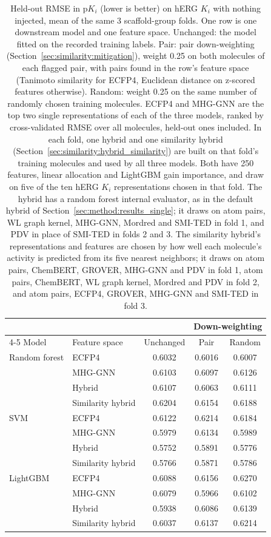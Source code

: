 \begin{table}[htbp]
\centering
\small
\begin{tabular}{@{}llccc@{}}
\toprule
 & & & \multicolumn{2}{c}{Down-weighting} \\
\cmidrule(l){4-5}
Model & Feature space & Unchanged & Pair & Random \\
\midrule
Random forest & ECFP4 & 0.6032 & 0.6016 & 0.6007 \\
 & MHG-GNN & 0.6103 & 0.6097 & 0.6126 \\
 & Hybrid & 0.6107 & 0.6063 & 0.6111 \\
 & Similarity hybrid & 0.6204 & 0.6154 & 0.6188 \\
\addlinespace
SVM & ECFP4 & 0.6122 & 0.6214 & 0.6184 \\
 & MHG-GNN & 0.5979 & 0.6134 & 0.5989 \\
 & Hybrid & 0.5752 & 0.5891 & 0.5776 \\
 & Similarity hybrid & 0.5766 & 0.5871 & 0.5786 \\
\addlinespace
LightGBM & ECFP4 & 0.6088 & 0.6156 & 0.6270 \\
 & MHG-GNN & 0.6079 & 0.5966 & 0.6102 \\
 & Hybrid & 0.5938 & 0.6086 & 0.6139 \\
 & Similarity hybrid & 0.6037 & 0.6137 & 0.6214 \\
\bottomrule
\end{tabular}
\caption[Pair down-weighting on the recorded hERG $K_i$ labels]{Held-out RMSE in p$K_i$ (lower is better) on hERG $K_i$ with nothing injected, mean of the same 3 scaffold-group folds. One row is one downstream model and one feature space. Unchanged: the model fitted on the recorded training labels. Pair: pair down-weighting (Section~\ref{sec:similarity:mitigation}), weight 0.25 on both molecules of each flagged pair, with pairs found in the row's feature space (Tanimoto similarity for ECFP4, Euclidean distance on z-scored features otherwise). Random: weight 0.25 on the same number of randomly chosen training molecules. ECFP4 and MHG-GNN are the top two single representations of each of the three models, ranked by cross-validated RMSE over all molecules, held-out ones included. In each fold, one hybrid and one similarity hybrid (Section~\ref{sec:similarity:hybrid_similarity}) are built on that fold's training molecules and used by all three models. Both have 250 features, linear allocation and LightGBM gain importance, and draw on five of the ten hERG $K_i$ representations chosen in that fold. The hybrid has a random forest internal evaluator, as in the default hybrid of Section~\ref{sec:method:results_single}; it draws on atom pairs, WL graph kernel, MHG-GNN, Mordred and SMI-TED in fold 1, and PDV in place of SMI-TED in folds 2 and 3. The similarity hybrid's representations and features are chosen by how well each molecule's activity is predicted from its five nearest neighbors; it draws on atom pairs, ChemBERT, GROVER, MHG-GNN and PDV in fold 1, atom pairs, ChemBERT, WL graph kernel, Mordred and PDV in fold 2, and atom pairs, ECFP4, GROVER, MHG-GNN and SMI-TED in fold 3.}

\end{table}
